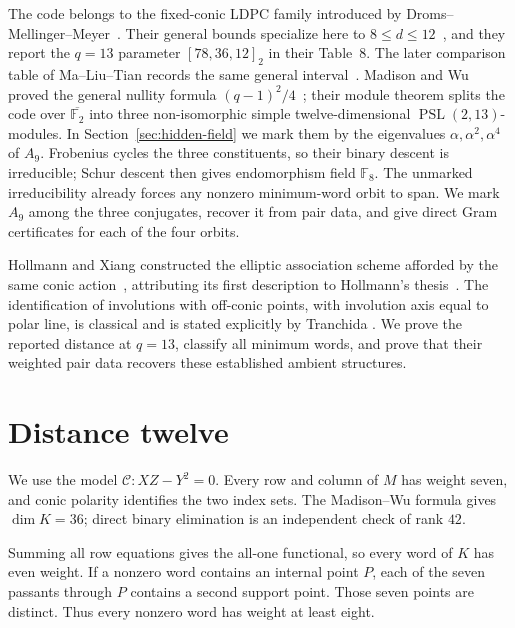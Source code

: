 \documentclass[11pt]{article}
\theoremstyle{definition}
\theoremstyle{remark}
\newcommand{\F}{\mathbb F}
\newcommand{\cC}{\mathcal C}
\begin{document}
The code belongs to the fixed-conic LDPC family introduced by
Droms--Mellinger--Meyer~\cite{DromsMellingerMeyer2006}.  Their general bounds
specialize here to \(8\le d\le12\)~\cite[Theorem~4.9]{DromsMellingerMeyer2006},
and they report the \(q=13\) parameter \([78,36,12]_2\) in their Table~8.
The later comparison table of Ma--Liu--Tian records the same general
interval~\cite[Table~1]{MaLiuTian2024}.
Madison and Wu proved the general nullity formula
\((q-1)^2/4\)~\cite[Corollary~5.4]{MadisonWu2012}; their module theorem
\cite[Theorem~5.1(i)]{MadisonWu2012} splits
the code over \(\overline{\F_2}\) into three non-isomorphic simple
twelve-dimensional \(\operatorname{PSL}(2,13)\)-modules.  In
Section~\ref{sec:hidden-field} we mark them by the eigenvalues
\(\alpha,\alpha^2,\alpha^4\) of \(A_9\).  Frobenius cycles the three
constituents, so their binary descent is irreducible; Schur descent then gives
endomorphism field \(\F_8\).  The unmarked irreducibility already forces any
nonzero minimum-word orbit to span.  We mark \(A_9\) among the three
conjugates, recover it from pair data, and give direct Gram certificates for
each of the four orbits.

Hollmann and Xiang constructed the elliptic association scheme afforded by
the same conic action~\cite[Sections~3--5]{HollmannXiang2006}, attributing its first
description to Hollmann's thesis~\cite{HollmannThesis1982}.  The identification
of involutions with off-conic points, with involution axis equal to polar line,
is classical and is stated explicitly by Tranchida
\cite[Section~2]{Tranchida2024}.  We prove the reported distance at
\(q=13\), classify all minimum words, and prove that their weighted pair data
recovers these established ambient structures.

\section{Distance twelve}
\label{sec:distance}

We use the model \(\cC:XZ-Y^2=0\).  Every row and column of \(M\) has
weight seven, and conic polarity identifies the two index sets.  The
Madison--Wu formula gives \(\dim K=36\); direct binary elimination is an
independent check of rank \(42\).

Summing all row equations gives the all-one functional, so every word of
\(K\) has even weight.  If a nonzero word contains an internal point \(P\),
each of the seven passants through \(P\) contains a second support point.
Those seven points are distinct.  Thus every nonzero word has weight at
least eight.
\end{document}
